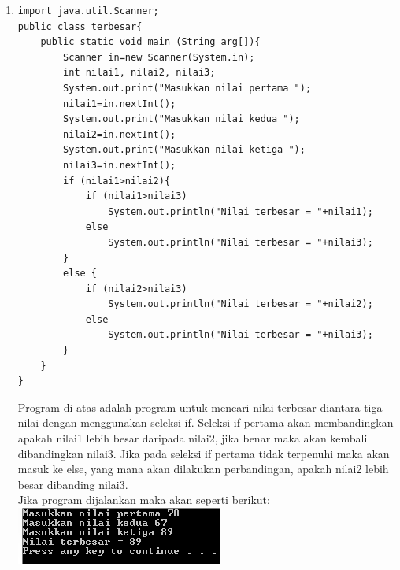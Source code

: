\documentclass[a4paper,12pt]{article}
\begin{document}
\begin{enumerate}[label=\textbf{\arabic* .}]
        \item
            \begin{lstlisting}[frame=single]
import java.util.Scanner;
public class terbesar{
    public static void main (String arg[]){
        Scanner in=new Scanner(System.in);
        int nilai1, nilai2, nilai3;
        System.out.print("Masukkan nilai pertama ");
        nilai1=in.nextInt();
        System.out.print("Masukkan nilai kedua ");
        nilai2=in.nextInt();
        System.out.print("Masukkan nilai ketiga ");
        nilai3=in.nextInt();
        if (nilai1>nilai2){
            if (nilai1>nilai3)
                System.out.println("Nilai terbesar = "+nilai1);
            else
                System.out.println("Nilai terbesar = "+nilai3);
        }
        else {
            if (nilai2>nilai3)
                System.out.println("Nilai terbesar = "+nilai2);
            else
                System.out.println("Nilai terbesar = "+nilai3);
        }
    }
}
            \end{lstlisting}
            Program di atas adalah program untuk mencari nilai terbesar diantara tiga nilai dengan menggunakan seleksi if. Seleksi if pertama akan membandingkan
            apakah nilai1 lebih besar daripada nilai2, jika benar maka akan kembali dibandingkan nilai3. Jika pada seleksi if pertama tidak terpenuhi maka akan
            masuk ke else, yang mana akan dilakukan perbandingan, apakah nilai2 lebih besar dibanding nilai3.\\
            Jika program dijalankan maka akan seperti berikut:\\
            \includegraphics{04b.PNG}

            \newpage
            

\end{enumerate}
\end{document}
